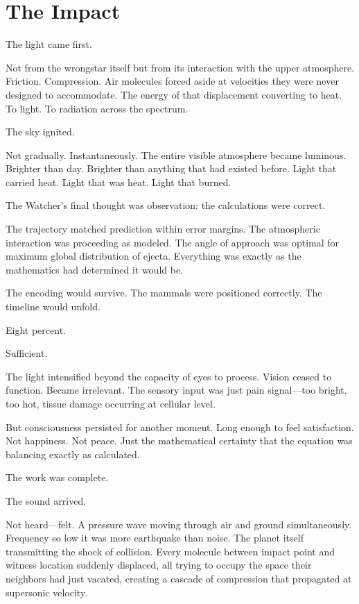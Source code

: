 \chapter{The Impact}
\label{ch:15}


The light came first.

Not from the wrongstar itself but from its interaction with the upper atmosphere. Friction. Compression. Air molecules forced aside at velocities they were never designed to accommodate. The energy of that displacement converting to heat. To light. To radiation across the spectrum.

The sky ignited.

Not gradually. Instantaneously. The entire visible atmosphere became luminous. Brighter than day. Brighter than anything that had existed before. Light that carried heat. Light that was heat. Light that burned.

The Watcher's final thought was observation: the calculations were correct.

The trajectory matched prediction within error margins. The atmospheric interaction was proceeding as modeled. The angle of approach was optimal for maximum global distribution of ejecta. Everything was exactly as the mathematics had determined it would be.

The encoding would survive. The mammals were positioned correctly. The timeline would unfold.

Eight percent.

Sufficient.

The light intensified beyond the capacity of eyes to process. Vision ceased to function. Became irrelevant. The sensory input was just pain signal—too bright, too hot, tissue damage occurring at cellular level.

But consciousness persisted for another moment. Long enough to feel satisfaction. Not happiness. Not peace. Just the mathematical certainty that the equation was balancing exactly as calculated.

The work was complete.

\scenebreak

The sound arrived.

Not heard—felt. A pressure wave moving through air and ground simultaneously. Frequency so low it was more earthquake than noise. The planet itself transmitting the shock of collision. Every molecule between impact point and witness location suddenly displaced, all trying to occupy the space their neighbors had just vacated, creating a cascade of compression that propagated at supersonic velocity.

